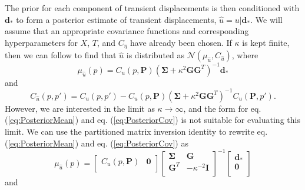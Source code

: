 \documentclass[10pt,letter]{article}
\begin{document}
The prior for each component of transient displacements is then conditioned with $\bm{d}_*$ to form a posterior estimate of transient displacements, $\hat{u} = u | \bm{d}_*$. We will assume that an appropriate covariance functions and corresponding hyperparameters for $X$, $T$, and $C_\eta$ have already been chosen. If $\kappa$ is kept finite, then we can follow \citet{Rasmussen2006} to find that $\hat{u}$ is distributed as $\mathcal{N}(\mu_{\hat{u}},C_{\hat{u}})$, where
\begin{equation}\label{eq:PosteriorMean}
\mu_{\hat{u}}(p) = C_u(p,\bm{P})\left(\bm{\Sigma} + \kappa^2\bm{G}\bm{G}^T\right)^{-1}\bm{d}_*
\end{equation}    
and
\begin{equation}\label{eq:PosteriorCov}
C_{\hat{u}}(p,p') = C_u(p,p') - C_u(p,\bm{P})\left(\bm{\Sigma} + \kappa^2\bm{G}\bm{G}^T\right)^{-1}C_u(\bm{P},p').
\end{equation}
However, we are interested in the limit as $\kappa \to \infty$, and the form for eq. (\ref{eq:PosteriorMean}) and eq. (\ref{eq:PosteriorCov}) is not suitable for evaluating this limit. We can use the partitioned matrix inversion identity \citep[e.g.,][]{Press2007} to rewrite eq. (\ref{eq:PosteriorMean}) and eq. (\ref{eq:PosteriorCov}) as
 \begin{equation}\label{eq:PosteriorMean2}
\mu_{\hat{u}}(p) = \left[\begin{array}{cc}
                         C_u(p,\bm{P}) & \bm{0} \\
                         \end{array}\right]
                   \left[\begin{array}{cc}
                         \bm{\Sigma} & \bm{G} \\
                         \bm{G}^T  & -\kappa^{-2} \bm{I} \\
                         \end{array}\right]^{-1}
                   \left[\begin{array}{c}
                         \bm{d}_* \\
                         \bm{0} \\
                         \end{array}\right]
\end{equation}    
and
\end{document}
